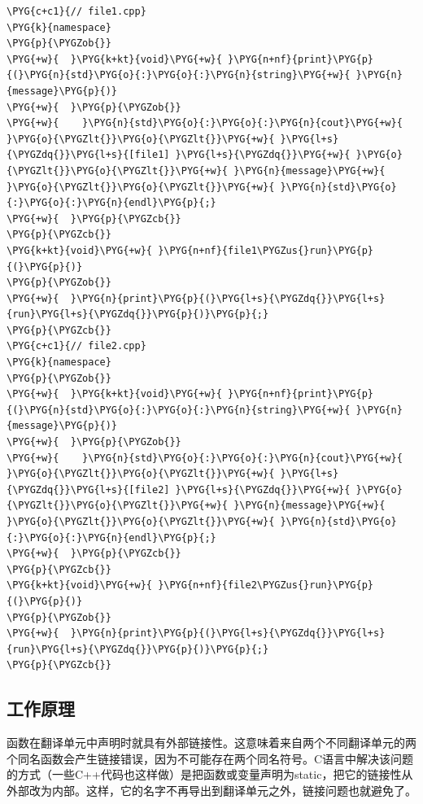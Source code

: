 \begin{codeblockbg}
\begin{Verbatim}[commandchars=\\\{\},breaklines=true,breakanywhere=true,fontsize=\codefont,xleftmargin=17bp]
\PYG{c+c1}{// file1.cpp}
\PYG{k}{namespace}
\PYG{p}{\PYGZob{}}
\PYG{+w}{  }\PYG{k+kt}{void}\PYG{+w}{ }\PYG{n+nf}{print}\PYG{p}{(}\PYG{n}{std}\PYG{o}{:}\PYG{o}{:}\PYG{n}{string}\PYG{+w}{ }\PYG{n}{message}\PYG{p}{)}
\PYG{+w}{  }\PYG{p}{\PYGZob{}}
\PYG{+w}{    }\PYG{n}{std}\PYG{o}{:}\PYG{o}{:}\PYG{n}{cout}\PYG{+w}{ }\PYG{o}{\PYGZlt{}}\PYG{o}{\PYGZlt{}}\PYG{+w}{ }\PYG{l+s}{\PYGZdq{}}\PYG{l+s}{[file1] }\PYG{l+s}{\PYGZdq{}}\PYG{+w}{ }\PYG{o}{\PYGZlt{}}\PYG{o}{\PYGZlt{}}\PYG{+w}{ }\PYG{n}{message}\PYG{+w}{ }\PYG{o}{\PYGZlt{}}\PYG{o}{\PYGZlt{}}\PYG{+w}{ }\PYG{n}{std}\PYG{o}{:}\PYG{o}{:}\PYG{n}{endl}\PYG{p}{;}
\PYG{+w}{  }\PYG{p}{\PYGZcb{}}
\PYG{p}{\PYGZcb{}}
\PYG{k+kt}{void}\PYG{+w}{ }\PYG{n+nf}{file1\PYGZus{}run}\PYG{p}{(}\PYG{p}{)}
\PYG{p}{\PYGZob{}}
\PYG{+w}{  }\PYG{n}{print}\PYG{p}{(}\PYG{l+s}{\PYGZdq{}}\PYG{l+s}{run}\PYG{l+s}{\PYGZdq{}}\PYG{p}{)}\PYG{p}{;}
\PYG{p}{\PYGZcb{}}
\PYG{c+c1}{// file2.cpp}
\PYG{k}{namespace}
\PYG{p}{\PYGZob{}}
\PYG{+w}{  }\PYG{k+kt}{void}\PYG{+w}{ }\PYG{n+nf}{print}\PYG{p}{(}\PYG{n}{std}\PYG{o}{:}\PYG{o}{:}\PYG{n}{string}\PYG{+w}{ }\PYG{n}{message}\PYG{p}{)}
\PYG{+w}{  }\PYG{p}{\PYGZob{}}
\PYG{+w}{    }\PYG{n}{std}\PYG{o}{:}\PYG{o}{:}\PYG{n}{cout}\PYG{+w}{ }\PYG{o}{\PYGZlt{}}\PYG{o}{\PYGZlt{}}\PYG{+w}{ }\PYG{l+s}{\PYGZdq{}}\PYG{l+s}{[file2] }\PYG{l+s}{\PYGZdq{}}\PYG{+w}{ }\PYG{o}{\PYGZlt{}}\PYG{o}{\PYGZlt{}}\PYG{+w}{ }\PYG{n}{message}\PYG{+w}{ }\PYG{o}{\PYGZlt{}}\PYG{o}{\PYGZlt{}}\PYG{+w}{ }\PYG{n}{std}\PYG{o}{:}\PYG{o}{:}\PYG{n}{endl}\PYG{p}{;}
\PYG{+w}{  }\PYG{p}{\PYGZcb{}}
\PYG{p}{\PYGZcb{}}
\PYG{k+kt}{void}\PYG{+w}{ }\PYG{n+nf}{file2\PYGZus{}run}\PYG{p}{(}\PYG{p}{)}
\PYG{p}{\PYGZob{}}
\PYG{+w}{  }\PYG{n}{print}\PYG{p}{(}\PYG{l+s}{\PYGZdq{}}\PYG{l+s}{run}\PYG{l+s}{\PYGZdq{}}\PYG{p}{)}\PYG{p}{;}
\PYG{p}{\PYGZcb{}}
\end{Verbatim}
\end{codeblockbg}



\subsection{工作原理}



函数在翻译单元中声明时就具有外部链接性。这意味着来自两个不同翻译单元的两个同名函数会产生链接错误，因为不可能存在两个同名符号。C语言中解决该问题的方式（一些C++代码也这样做）是把函数或变量声明为static，把它的链接性从外部改为内部。这样，它的名字不再导出到翻译单元之外，链接问题也就避免了。


